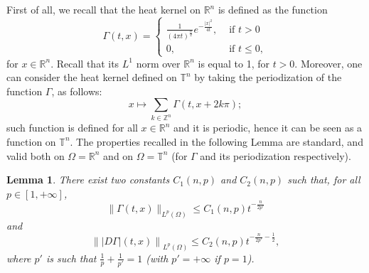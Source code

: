 \documentclass[10pt,a4paper,nouppercase,nowrite]{article}
\numberwithin{equation}{section}
\newcommand{\R}{\mathbb{R}}
\newcommand{\T}{\mathbb{T}}
\newtheorem{lem}[defn]{Lemma}
\theoremstyle{definition}
\newtheorem{rmk}[defn]{Remark}
\begin{document}
	First of all, we recall that the heat kernel on $\R^n$ is defined as the function
	\begin{equation*}
		\Gamma(t,x)=
		\begin{cases}
			\frac{1}{(4\pi t)^{\frac{n}{2}}} e^{-\frac{|x|^2}{4t}} ,& \text{ if } t > 0 \\
			0,& \text{ if } t \le 0,
		\end{cases}
	\end{equation*}
	for $x \in \mathbb{R}^n$. Recall that its $L^{1}$ norm over $\R^n$ is equal to 1, for $t > 0$. Moreover, one can consider the heat kernel defined on $\T^n$ by taking the periodization of the function $\Gamma$, as follows:
	\begin{equation*}
		x \mapsto \sum_{k \in \mathbb{Z}^n} \Gamma(t,x+2k\pi);
	\end{equation*}
	such function is defined for all $x \in \R^n$ and it is periodic, hence it can be seen as a function on $\T^n$. The properties recalled in the following Lemma are standard, and valid both on $\Omega=\R^n$ and on $\Omega=\T^n$ (for $\Gamma$ and its periodization respectively).
\begin{lem}	\label{lemfix1}
		There exist two constants $C_1(n,p)$ and $C_2(n,p)$ such that, for all $p \in [1,+\infty]$,
		\begin{equation*}
			\| \Gamma(t,x) \|_{L^{p}(\Omega)} \le C_1(n,p) t^{-\frac{n}{2p'}}
		\end{equation*}
		and
		\begin{equation*}
			\left\| |D\Gamma|(t,x) \right\|_{L^p(\Omega)} \le C_2(n,p) t^{-\frac{n}{2p'}-\frac{1}{2}},
		\end{equation*}
		where $p'$ is such that $\frac{1}{p}+\frac{1}{p'} = 1$ (with $p'=+\infty$ if $p=1$).
	\end{lem}
\end{document}
